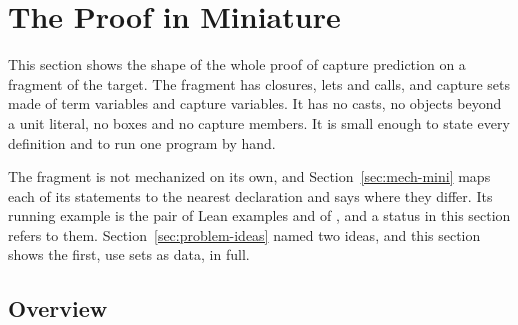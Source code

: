 \section{The Proof in Miniature}\label{sec:mini}
\mathtgt

This section shows the shape of the whole proof of capture prediction on a fragment of the \treeK target. The fragment has closures, lets and calls, and capture sets made of term variables and capture variables. It has no casts, no objects beyond a unit literal, no boxes and no capture members. It is small enough to state every definition and to run one program by hand.

The fragment is not mechanized on its own, and Section~\ref{sec:mech-mini} maps each of its statements to the nearest declaration and says where they differ. Its running example is the pair of Lean examples  and  of \treeK, and a status in this section refers to them. Section~\ref{sec:problem-ideas} named two ideas, and this section shows the first, use sets as data, in full.

\FloatBarrier
\subsection{Overview}\label{sec:mini-overview}

